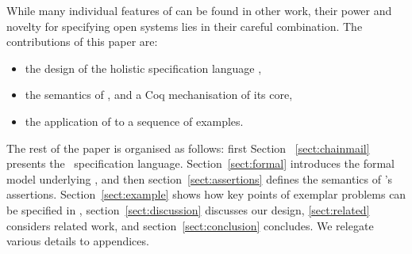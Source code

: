 
While many individual features of \Chainmail can be found in other work, 
their power and novelty for specifying open systems lies in their careful combination.
The contributions of this paper are:
\begin{itemize}
\item the design of the holistic specification language \Chainmail,
\item the semantics of \Chainmail, and a Coq mechanisation of its core,
\item the application of \Chainmail  to a sequence of examples.
\end{itemize}  
  
  
The rest of the paper is organised as follows:
first Section
~\ref{sect:chainmail} presents the \Chainmail\ specification
language.  Section~\ref{sect:formal} introduces the formal model
underlying \Chainmail, and then section~\ref{sect:assertions} defines
the 
semantics of \Chainmail's assertions.
Section~\ref{sect:example} shows how key points of 
exemplar problems can be specified in \Chainmail,
section~\ref{sect:discussion}
discusses our design, \ref{sect:related} considers related
work, and section~\ref{sect:conclusion} concludes.
We relegate various details to appendices.
